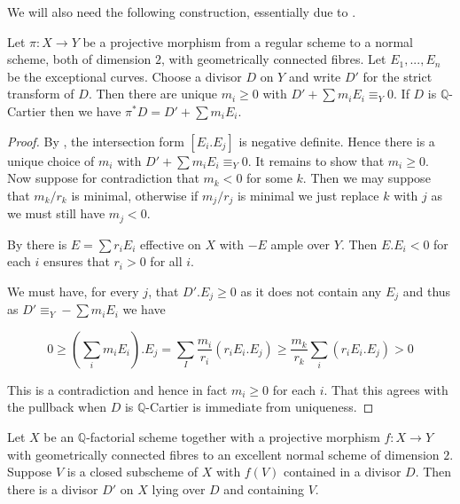 \documentclass[a4paper,12pt]{amsart}
\begin{document}
	We will also need the following construction, essentially due to \cite{mumford1961topology}.
	
	\begin{lemma}
		
		Let $\pi:X \to Y$ be a projective morphism from a regular scheme to a normal scheme, both of dimension $2$, with geometrically connected fibres. Let $E_{1},...,E_{n}$ be the exceptional curves. Choose a divisor $D$ on $Y$ and write $D'$ for the strict transform of $D$. Then there are unique $m_{i} \geq 0$ with $D'+\sum m_{i}E_{i} \equiv_{Y} 0$. If $D$ is $\mathbb{Q}$-Cartier then we have $\pi^{*}D= D'+\sum m_{i}E_{i}$.
		
	\end{lemma}
	
	\begin{proof}
		
		By \cite[Theorem 10.1]{kk-singbook}, the intersection form $[E_{i}.E_{j}]$ is negative definite. Hence there is a unique choice of $m_{i}$ with $D'+\sum m_{i}E_{i} \equiv_{Y} 0$. It remains to show that $m_{i} \geq 0$. Now suppose for contradiction that $m_{k} < 0$ for some $k$. Then we may suppose that $m_{k}/r_{k}$ is minimal, otherwise if $m_{j}/r_{j}$ is minimal we just replace $k$ with $j$ as we must still have $m_{j} < 0$.
		
		By \cite[Lemma 10.2]{kk-singbook} there is $E= \sum r_{i}E_{i}$ effective on $X$ with $-E$ ample over $Y$. Then $E.E_{i} < 0$ for each $i$ ensures that $r_{i} > 0$ for all $i$.
				
		We must have, for every $j$, that $D'.E_{j}\geq 0 $ as it does not contain any $E_{j}$ and thus as $D' \equiv_{Y} - \sum m_{i}E_{i}$ we have
		
		\[0\geq (\sum_{i} m_{i} E_{i}).E_{j} = \sum_{I} \frac{m_{i}}{r_{i}}(r_{i}E_{i}.E_{j}) \geq \frac{m_{k}}{r_{k}} \sum_{i} (r_{i}E_{i}.E_{j}) > 0\]
		
		This is a contradiction and hence in fact $m_{i} \geq 0$ for each $i$. That this agrees with the pullback when $D$ is $\mathbb{Q}$-Cartier is immediate from uniqueness.
		
	\end{proof}
	
	\begin{lemma}\label{num-pull}
		
		Let $X$ be an $\mathbb{Q}$-factorial scheme together with a projective morphism $f:X \to Y$  with geometrically connected fibres to an excellent normal scheme of dimension $2$. Suppose $V$ is a closed subscheme of $X$ with $f(V)$ contained in a divisor $D$. Then there is a divisor $D'$ on $X$ lying over $D$ and containing $V$.
		
		\end{lemma}
	
\end{document}
